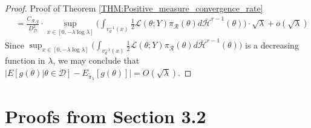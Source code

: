 \documentclass[10pt,fleqn]{article}
\DeclareMathOperator{\1}{\mathbbm{1}}
\begin{document}
\begin{proof}{Proof of Theorem \ref{THM:Positive_measure_convergence_rate}}
\begin{align*}
&= \frac{C_{\mathcal{R},g}}{D_\mathcal{D}^2} \cdot \sup_{x \in [0,-\lambda\log\lambda]} \bigg( \int_{v_d^{-1}(x)} \frac{1}{2}\mathcal{L}(\theta;Y) \pi_\mathcal{R}(\theta) d\bar{\mathcal{H}}^{r-1}(\theta)\bigg)  \cdot \sqrt{\lambda} + o(\sqrt{\lambda})
\end{align*}
Since $\sup_{x \in [0,-\lambda\log\lambda]} \bigg( \int_{v_d^{-1}(x)} \frac{1}{2}\mathcal{L}(\theta;Y) \pi_\mathcal{R}(\theta) d\bar{\mathcal{H}}^{r-1}(\theta)\bigg)$ is a decreasing function in $\lambda$, we may conclude that $\big| E[g(\theta)|\theta\in\mathcal{D}]-E_{\tilde{\pi}_\lambda}[g(\theta)]\big| = O(\sqrt{\lambda}).$
\end{proof}

\section{Proofs from Section 3.2}
\end{document}
